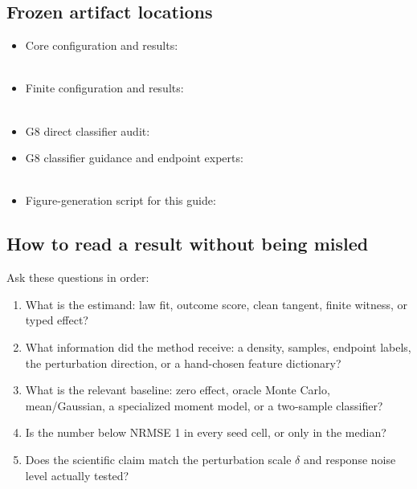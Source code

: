 \documentclass[11pt]{article}
\begin{document}
\subsection{Frozen artifact locations}

\small
\begin{itemize}
  \item Core configuration and results:\\
  \\
  \item Finite configuration and results:\\
  \\
  \item G8 direct classifier audit:\\
  \item G8 classifier guidance and endpoint experts:\\
  \\
  \item Figure-generation script for this guide:\\
\end{itemize}

\normalsize
\subsection{How to read a result without being misled}

Ask these questions in order:
\begin{enumerate}
  \item What is the estimand: law fit, outcome score, clean tangent, finite witness, or
        typed effect?
  \item What information did the method receive: a density, samples, endpoint labels,
        the perturbation direction, or a hand-chosen feature dictionary?
  \item What is the relevant baseline: zero effect, oracle Monte Carlo, mean/Gaussian,
        a specialized moment model, or a two-sample classifier?
  \item Is the number below NRMSE 1 in every seed cell, or only in the median?
  \item Does the scientific claim match the perturbation scale $\delta$ and response
        noise level actually tested?
\end{enumerate}
\end{document}
